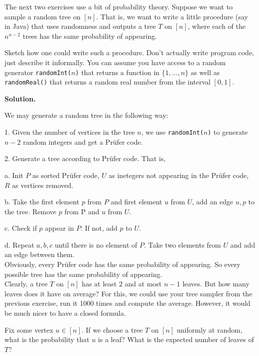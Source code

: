 The next two exercises use a bit of probability theory. Suppose we want to sample a random
tree on $[n]$. That is, we want to write a little procedure (say in Java) that uses randomness and outputs
a tree $T$ on $[n]$, where each of the $n^{n-2}$ trees has the same probability of 
appearing. 

\begin{exercise}
   Sketch how one could write such a procedure. Don't actually write program code, just
   describe it informally. You can assume you have access to a random generator
   \texttt{randomInt($n$)} that returns a function in $\{1,\dots,n\}$ as well
   as \texttt{randomReal()} that returns a random real number from the interval $[0,1]$.
\end{exercise}


\textbf{Solution.}
\par We may generate a random tree in the following way:
\par 1. Given the number of vertices in the tree $n$, we use \texttt{randomInt($n$)} to generate $n-2$ random integers and get a Pr\"ufer code.
\par 2. Generate a tree according to Pr\"ufer code. That is,
\par a. Init $P$ as sorted Pr\"ufer code, $U$ as inetegers not appearing in the Pr\"ufer code, $R$ as vertices removed.
\par b. Take the first element $p$ from $P$ and first element $u$ from $U$, add an edge ${u,p}$ to the tree. Remove $p$ from P and $u$ from $U$.
\par c. Check if $p$ appear in $P$. If not, add $p$ to $U$.
\par d. Repeat $a,b,c$ until there is no element of $P$. Take two elements from $U$ and add an edge between them.\\
Obviously, every Pr\"ufer code has the same probability of appearing. So every possible tree has the same probability of appearing.\\


Clearly, a tree $T$ on $[n]$ has at least $2$ and at most $n-1$ leaves. But how 
many leaves does it have on average? For this, we could use your tree sampler from the previous
exercise, run it 1000 times and compute the average. However, it would be much nicer to have 
a closed formula.

\begin{exercise}
  Fix some vertex $u \in [n]$. If we choose a tree $T$ on $[n]$ uniformly at random,
  what is the probability that $u$ is a leaf?
   What is the expected number of leaves of $T$?
\end{exercise}

